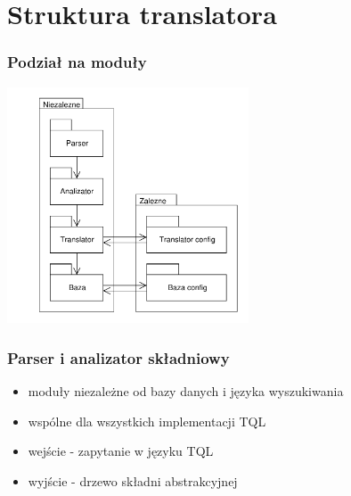 \documentclass[xcolor=dvipsnames,10pt]{beamer}
\begin{document}
\section{Struktura translatora}




\begin{frame}
     \frametitle{Podział na moduły}
     
\begin{center}
\includegraphics[height=70mm]{pakiety.pdf}
\end{center}

\end{frame}

\begin{frame}
     \frametitle{Parser i analizator składniowy}
     
\begin{itemize}
\item moduły niezależne od bazy danych i języka wyszukiwania
\item wspólne dla wszystkich  implementacji TQL
\item wejście - zapytanie w języku TQL
\item wyjście - drzewo składni abstrakcyjnej

\end{itemize}


\end{frame}
\end{document}
